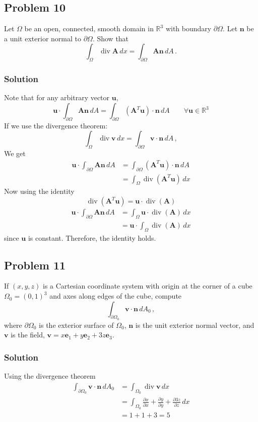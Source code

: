 \documentclass[letterpaper,10pt]{article}
\begin{document}
\subsection*{Problem 10}
Let $\Omega$ be an open, connected, smooth domain in $\mathbb{R}^3$ with
boundary $\partial\Omega$. Let $\mathbf{n}$ be a unit exterior normal to
$\partial\Omega$. Show that
\[
\int_\Omega
\operatorname{div}\mathbf{A}\,dx=\int_{\partial\Omega}\mathbf{An}\,dA\,.
\]

\subsubsection*{Solution}
Note that for any arbitrary vector $\mathbf{u}$,
\[
\mathbf{u}\cdot\int_{\partial\Omega}\mathbf{An}\,dA=\int_{\partial\Omega}
(\mathbf{A}^T\mathbf{u})\cdot\mathbf{n}\,dA
\qquad\forall\mathbf{u}\in\mathbb{R}^3
\]
If we use the divergence theorem:
\[
\int_\Omega\operatorname{div}\mathbf{v}\,dx
=\int_{\partial\Omega}\mathbf{v}\cdot\mathbf{n}\,dA\,,
\]
We get
\begin{align*}
\mathbf{u}\cdot\int_{\partial\Omega}\mathbf{An}\,dA
&=\int_{\partial\Omega}
(\mathbf{A}^T\mathbf{u})\cdot\mathbf{n}\,dA\\
&=\int_\Omega\operatorname{div}(\mathbf{A}^T\mathbf{u})\,dx
\end{align*}
Now using the identity
\[
\operatorname{div}(\mathbf{A}^T\mathbf{u})=\mathbf{u}\cdot\operatorname{div}(
\mathbf{A})
\]
\begin{align*}
\mathbf{u}\cdot\int_{\partial\Omega}\mathbf{An}\,dA
&=\int_\Omega\mathbf{u}\cdot\operatorname{div}(\mathbf{A})\,dx\\
&=\mathbf{u}\cdot\int_\Omega\operatorname{div}(\mathbf{A})\,dx
\end{align*}
since $\mathbf{u}$ is constant. Therefore, the identity holds.

\subsection*{Problem 11}
If $(x,y,z)$ is a Cartesian coordinate system with origin at the corner of a
cube $\Omega_0=(0,1)^3$ and axes along edges of the cube, compute
\[
\int_{\partial\Omega_0}\mathbf{v}\cdot\mathbf{n}\,dA_0\,,
\]
where $\partial\Omega_0$ is the exterior surface of $\Omega_0$, $\mathbf{n}$ is
the unit exterior normal vector, and $\mathbf{v}$ is the field,
$\mathbf{v}=x\mathbf{e}_1+y\mathbf{e}_2+3z\mathbf{e}_3$.
\subsubsection*{Solution}
Using the divergence theorem
\begin{align*}
\int_{\partial\Omega_0}\mathbf{v}\cdot\mathbf{n}\,dA_0
&=\int_{\Omega_0}\operatorname{div}\mathbf{v}\,dx\\
&=\int_{\Omega_0}\frac{\partial x}{\partial x}+\frac{\partial y}{\partial
y}+\frac{\partial 3z}{\partial z}\,dx\\
&=1+1+3=5
\end{align*}
\end{document}
